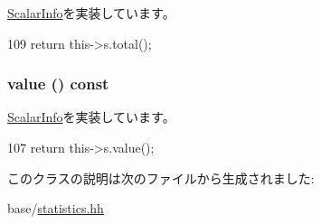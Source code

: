 \hyperlink{classStats_1_1ScalarInfo_ab152b7e89b37a7db03b04d500ceb8349}{ScalarInfo}を実装しています。


\begin{DoxyCode}
109 { return this->s.total(); }
\end{DoxyCode}
\hypertarget{classStats_1_1ScalarInfoProxy_aa9e486cb7eb0ad44f5f89923594b68a4}{
\subsubsection[{value}]{ value () const}}
\label{classStats_1_1ScalarInfoProxy_aa9e486cb7eb0ad44f5f89923594b68a4}


\hyperlink{classStats_1_1ScalarInfo_a1fb831559ad900460c4c9e4f546cd234}{ScalarInfo}を実装しています。


\begin{DoxyCode}
107 { return this->s.value(); }
\end{DoxyCode}


このクラスの説明は次のファイルから生成されました:\begin{DoxyCompactItemize}
\item 
base/\hyperlink{statistics_8hh}{statistics.hh}\end{DoxyCompactItemize}

